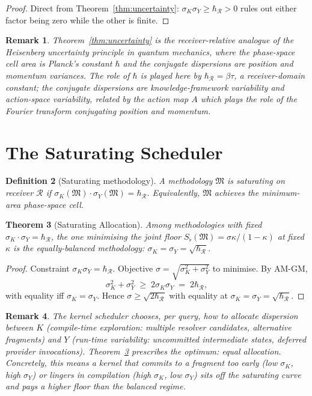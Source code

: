 \documentclass[11pt,a4paper]{article}
\newtheorem{theorem}{Theorem}[section]
\newtheorem{definition}[theorem]{Definition}
\newtheorem{remark}[theorem]{Remark}
\newcommand{\Method}{\mathfrak{M}}
\newcommand{\receiver}{\mathcal{R}}
\newcommand{\Sfloor}{S_{\flat}}
\newcommand{\hbarR}{\hbar_{\receiver}}
\newcommand{\catpow}{\kappa}
\newcommand{\disp}{\sigma}
\begin{document}
\begin{proof}
Direct from Theorem~\ref{thm:uncertainty}: $\disp_K \disp_Y \geq \hbarR > 0$ rules out either factor being zero while the other is finite.
\end{proof}

\begin{remark}
\label{rem:heisenberg-form}
Theorem~\ref{thm:uncertainty} is the receiver-relative analogue of the Heisenberg uncertainty principle in quantum mechanics, where the phase-space cell area is Planck's constant $\hbar$ and the conjugate dispersions are position and momentum variances. The role of $\hbar$ is played here by $\hbarR = \beta \tau$, a receiver-domain constant; the conjugate dispersions are knowledge-framework variability and action-space variability, related by the action map $A$ which plays the role of the Fourier transform conjugating position and momentum.
\end{remark}

\section{The Saturating Scheduler}
\label{sec:scheduler}

\begin{definition}[Saturating methodology]
\label{def:saturating}
A methodology $\Method$ is \emph{saturating} on receiver $\receiver$ if $\disp_K(\Method) \cdot \disp_Y(\Method) = \hbarR$. Equivalently, $\Method$ achieves the minimum-area phase-space cell.
\end{definition}

\begin{theorem}[Saturating Allocation]
\label{thm:saturating-alloc}
Among methodologies with fixed $\disp_K \cdot \disp_Y = \hbarR$, the one minimising the joint floor $\Sfloor(\Method) = \disp \catpow/(1-\catpow)$ at fixed $\catpow$ is the equally-balanced methodology: $\disp_K = \disp_Y = \sqrt{\hbarR}$.
\end{theorem}

\begin{proof}
Constraint $\disp_K \disp_Y = \hbarR$. Objective $\disp = \sqrt{\disp_K^2 + \disp_Y^2}$ to minimise. By AM-GM,
\[
\disp_K^2 + \disp_Y^2 \;\geq\; 2 \disp_K \disp_Y \;=\; 2 \hbarR,
\]
with equality iff $\disp_K = \disp_Y$. Hence $\disp \geq \sqrt{2 \hbarR}$ with equality at $\disp_K = \disp_Y = \sqrt{\hbarR}$.
\end{proof}

\begin{remark}
\label{rem:scheduler-implication}
The kernel scheduler chooses, per query, how to allocate dispersion between $K$ (compile-time exploration: multiple resolver candidates, alternative fragments) and $Y$ (run-time variability: uncommitted intermediate states, deferred provider invocations). Theorem~\ref{thm:saturating-alloc} prescribes the optimum: equal allocation. Concretely, this means a kernel that commits to a fragment too early (low $\disp_K$, high $\disp_Y$) or lingers in compilation (high $\disp_K$, low $\disp_Y$) sits off the saturating curve and pays a higher floor than the balanced regime.
\end{remark}
\end{document}
